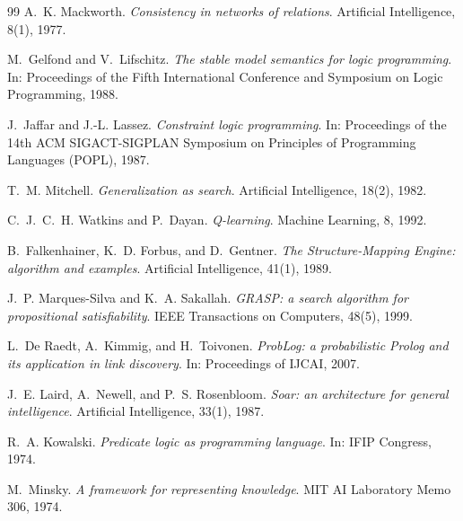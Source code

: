 \documentclass[11pt,oneside]{report}
\begin{document}
\begin{thebibliography}{99}
 A.~K. Mackworth.
\emph{Consistency in networks of relations}. Artificial Intelligence, 8(1),
1977.

 M.~Gelfond and V.~Lifschitz.
\emph{The stable model semantics for logic programming}. In: Proceedings of
the Fifth International Conference and Symposium on Logic Programming,
1988.

 J.~Jaffar and J.-L. Lassez.
\emph{Constraint logic programming}. In: Proceedings of the 14th ACM
SIGACT-SIGPLAN Symposium on Principles of Programming Languages (POPL),
1987.

 T.~M. Mitchell.
\emph{Generalization as search}. Artificial Intelligence, 18(2), 1982.

 C.~J.~C.~H. Watkins and P.~Dayan.
\emph{Q-learning}. Machine Learning, 8, 1992.

 B.~Falkenhainer, K.~D. Forbus, and D.~Gentner.
\emph{The Structure-Mapping Engine: algorithm and examples}. Artificial
Intelligence, 41(1), 1989.

 J.~P. Marques-Silva and K.~A. Sakallah.
\emph{GRASP: a search algorithm for propositional satisfiability}. IEEE
Transactions on Computers, 48(5), 1999.

 L.~De Raedt, A.~Kimmig, and H.~Toivonen.
\emph{ProbLog: a probabilistic Prolog and its application in link
discovery}. In: Proceedings of IJCAI, 2007.

 J.~E. Laird, A.~Newell, and P.~S. Rosenbloom.
\emph{Soar: an architecture for general intelligence}. Artificial
Intelligence, 33(1), 1987.

 R.~A. Kowalski.
\emph{Predicate logic as programming language}. In: IFIP Congress, 1974.

 M.~Minsky.
\emph{A framework for representing knowledge}. MIT AI Laboratory Memo 306,
1974.

\end{thebibliography}
\end{document}
